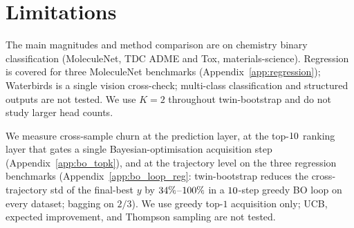 \section{Limitations}
\label{sec:limitations}

The main magnitudes and method comparison are on chemistry binary
classification (MoleculeNet, TDC ADME and Tox, materials-science).
Regression is covered for three MoleculeNet benchmarks
(Appendix~\ref{app:regression}); Waterbirds is a single vision
cross-check; multi-class classification and structured outputs are
not tested.  We use $K{=}2$ throughout twin-bootstrap and do not study larger head
counts.  

We measure cross-sample churn at the prediction layer, at the
top-$10$ ranking layer that gates a single
Bayesian-optimisation acquisition step
(Appendix~\ref{app:bo_topk}), and at the trajectory level on the
three regression benchmarks (Appendix~\ref{app:bo_loop_reg}:
twin-bootstrap reduces the cross-trajectory std of the final-best
$y$ by $34\%$--$100\%$ in
a $10$-step greedy BO loop on every dataset; bagging
on $2/3$).  We use greedy top-$1$ acquisition only; UCB, expected
improvement, and Thompson sampling are not tested.
